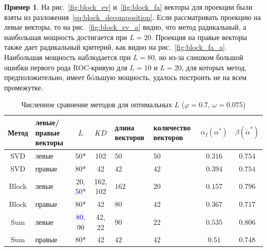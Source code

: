 \documentclass[specialist,
substylefile = spbu_report.rtx,
subf,href,colorlinks=true, 12pt]{disser}
\theoremstyle{definition}
\newtheorem{example}{Пример}
\begin{document}
\begin{example}
На рис.~\ref{fig:block_ev} и~\ref{fig:block_fa} векторы для проекции были взяты из разложения~\eqref{eq:block_decomposition}. Если рассматривать проекцию на левые векторы, то на рис.~\ref{fig:block_ev_a} видно, что метод радикальный, а наибольшая мощность достигается при $L=20$. Проекция на правые векторы также дает радикальный критерий, как видно на рис.~\ref{fig:block_fa_a}. Наибольшая мощность наблюдается при $L=80$, но из-за слишком большой ошибки первого рода ROC-кривую для $L=10$ и $L=20$, для которых метод, предположительно, имеет б\'oльшую мощность, удалось построить не на всем промежутке.
\begin{table}[h]
	\caption{Численное сравнение методов для оптимальных $L$ ($\varphi=0.7$, $\omega=0.075$)}
	\label{tab:res_mc-ssa}
	\centering
	\begin{tabular}{|c>{\centering\arraybackslash}m{1in}cc>{\centering\arraybackslash}m{1in} >{\centering\arraybackslash}m{1in}cc|}\hline
		Метод & левые/правые векторы & $L$ & $KD$ & длина векторов & количество векторов & $\alpha_I(\alpha^*)$ & $\beta(\widetilde\alpha^*)$ \\
		\hline
		SVD & левые & $50$* &102& $50$ & $50$ & $0.316$ & $0.754$\\
		\hline
		SVD & правые & $80$* &42& $42$ & $42$ & $0.394$ & $0.754$\\
		\hline
		Block & левые & 20, \textcolor{blue}{50}* & 162, 102 & $162$ & $20$ & $0.157$ & $\mathbf{0.796}$ \\
		\hline
		Block & правые & $80$* &42& $80$ & $42$ & $0.367$ & $0.717$\\
		\hline
		Sum & левые & \textcolor{blue}{80}, 90 &42, 22& $90$ & $22$ & $0.535$ & $\mathbf{0.806}$ \\
		\hline
		Sum & правые & $80$* &42& $42$ & $42$ & $0.51$ & $0.748$ \\
		\hline
	\end{tabular}
\end{table}

\end{example}
\end{document}
